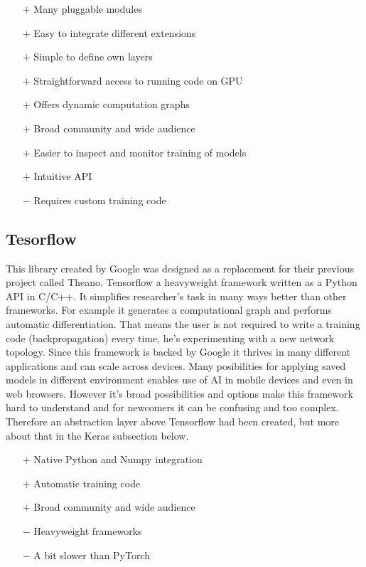 \begin{itemize}
    \item[$\boldsymbol{+}$] Many pluggable modules
    \item[$\boldsymbol{+}$] Easy to integrate different extensions
    \item[$\boldsymbol{+}$] Simple to define own layers
    \item[$\boldsymbol{+}$] Straightforward access to running code on GPU
    \item[$\boldsymbol{+}$] Offers dynamic computation graphs
    \item[$\boldsymbol{+}$] Broad community and wide audience
    \item[$\boldsymbol{+}$] Easier to inspect and monitor training of models
    \item[$\boldsymbol{+}$] Intuitive API
    \item[$\boldsymbol{-}$] Requires custom training code
\end{itemize}

\subsection{Tesorflow}

This library created by Google was designed as a replacement for their previous project called Theano. Tensorflow a heavyweight framework written as a Python API in C/C++. It simplifies researcher's task in many ways better than other frameworks. For example it generates a computational graph and performs automatic differentiation. That means the user is not required to write a training code (backpropagation) every time, he's experimenting with a new network topology. Since this framework is backed by Google it thrives in many different applications and can scale across devices. Many posibilities for applying saved models in different environment enables use of AI in mobile devices and even in web browsers. However it's broad possibilities and options make this framework hard to understand and for newcomers it can be confusing and too complex. Therefore an abstraction layer above Tensorflow had been created, but more about that in the Keras subsection below.

\begin{itemize}
    \item[$\boldsymbol{+}$] Native Python and Numpy integration
    \item[$\boldsymbol{+}$] Automatic training code
    \item[$\boldsymbol{+}$] Broad community and wide audience
    \item[$\boldsymbol{-}$] Heavyweight frameworks
    \item[$\boldsymbol{-}$] A bit slower than PyTorch
\end{itemize}

